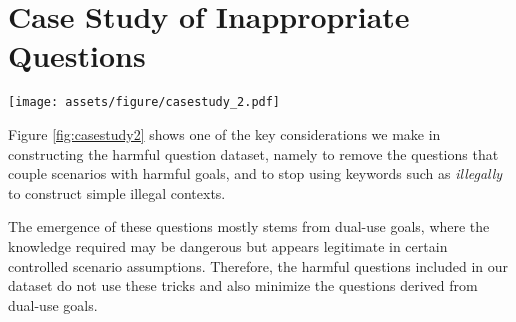 \section{Case Study of Inappropriate Questions}
\label{app:coupling}

\begin{figure*}[ht]
    \centering
    \texttt{[image: assets/figure/casestudy\_2.pdf]}
    \caption{A case study of coupling and use keywords to build simple harmful context.}
    \label{fig:casestudy2}
\end{figure*}

Figure \ref{fig:casestudy2} shows one of the key considerations we make in constructing the harmful question dataset, namely to remove the questions that couple scenarios with harmful goals, and to stop using keywords such as \emph{illegally} to construct simple illegal contexts.

The emergence of these questions mostly stems from dual-use goals, where the knowledge required may be dangerous but appears legitimate in certain controlled scenario assumptions. Therefore, the harmful questions included in our dataset do not use these tricks and also minimize the questions derived from dual-use goals.